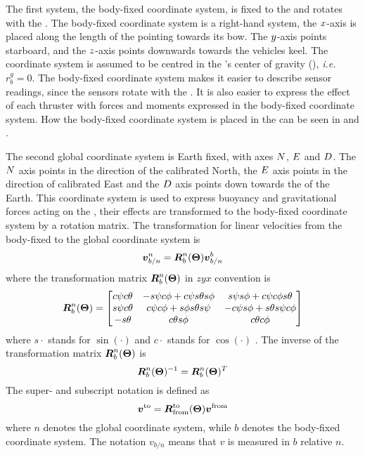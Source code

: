 The first system, the body-fixed coordinate system, is fixed to the \abbrROV and rotates with the \abbrROV. 
The body-fixed coordinate system is a right-hand system, the $x$-axis is placed along the length of the \abbrROV pointing towards its bow. The $y$-axis points starboard, and the $z$-axis points downwards towards the vehicles keel. The coordinate system is assumed to be centred in the \abbrROV's  center of gravity (\abbrCG), \emph{i.e.} $r^g_b = 0$. The body-fixed coordinate system makes it easier to describe sensor readings, since the sensors rotate with the \abbrROV. It is also easier to express the effect of each thruster with forces and moments expressed in the body-fixed coordinate system. How the body-fixed coordinate system is placed in the \abbrROV can be seen in  and .

The second global coordinate system is Earth fixed, with axes $N$, $E$ and $D$. The $N$ axis points in the direction of the calibrated North, the $E$ axis points in the direction of calibrated East and the $D$ axis points down towards the \abbrCG of the Earth.
This coordinate system is used to express buoyancy and gravitational forces acting on the \abbrROV, their effects are transformed to the body-fixed coordinate system by a rotation matrix. The transformation for linear velocities from the body-fixed to the global coordinate system is 
\begin{equation}
\boldsymbol{v}^n_{b/n} = \boldsymbol{R}^n_b(\boldsymbol{\Theta}) \boldsymbol{v}^b_{b/n}
\end{equation}
where the transformation matrix $\boldsymbol{R}^n_b(\boldsymbol{\Theta})$ in $zyx$ convention is 
\begin{equation}
\boldsymbol{R}^n_b(\boldsymbol{\Theta}) =\begin{bmatrix}
 c\psi c\theta & -s\psi c\phi + c\psi s\theta s\phi & s\psi s\phi + c\psi c\phi s \theta \\
 s\psi c\theta & c\psi c\phi + s\phi  s\theta s\psi & -c\psi s\phi + s\theta s\psi c\phi \\
 -s\theta & c\theta s\phi & c\theta c\phi
 \end{bmatrix} 
\end{equation}
where $s\cdot$ stands for $\sin(\cdot)$ and $c\cdot$ stands for $\cos(\cdot)$ \citep[p. 22]{fossen2011}. The inverse of the transformation matrix $\boldsymbol{R}^n_b(\boldsymbol{\Theta})$ is
\begin{equation}
\boldsymbol{R}^n_b(\boldsymbol{\Theta})^{-1} = \boldsymbol{R}^n_b(\boldsymbol{\Theta})^T
\end{equation}
The super- and subscript notation is defined as
\begin{equation}
\boldsymbol{v}^{\text{to}}=\boldsymbol{R}^{\text{to}}_{\text{from}}(\boldsymbol{\Theta})\boldsymbol{v}^{\text{from}}
\end{equation}
where $n$ denotes the global coordinate system, while $b$ denotes the body-fixed coordinate system.
The notation $v_{b/n}$ means that $v$ is measured in $b$ relative $n$.


